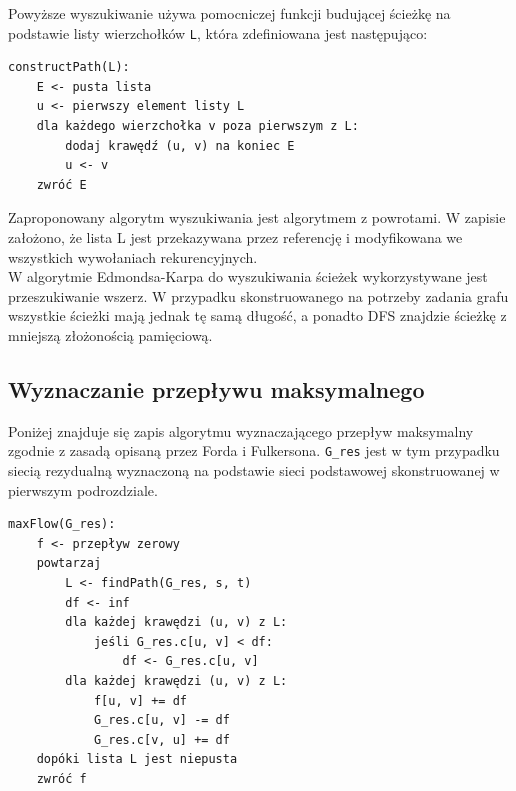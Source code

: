 \documentclass[12pt,a4paper]{article}
\theoremstyle{definition}
\begin{document}
\vspace{0.5em}
\noindent
Powyższe wyszukiwanie używa pomocniczej funkcji budującej ścieżkę na podstawie listy wierzchołków \texttt{L}, która zdefiniowana jest następująco:\\

\begin{tcolorbox}[title=Budowanie ścieżki na podstawie wierzchołków]
\begin{verbatim}
constructPath(L):
    E <- pusta lista
    u <- pierwszy element listy L
    dla każdego wierzchołka v poza pierwszym z L:
        dodaj krawędź (u, v) na koniec E
        u <- v
    zwróć E
\end{verbatim}
\end{tcolorbox}

\vspace{0.5em}
\noindent
Zaproponowany algorytm wyszukiwania jest algorytmem z powrotami. W zapisie założono, że lista L jest przekazywana przez referencję i modyfikowana we wszystkich wywołaniach rekurencyjnych.\\

\noindent
W algorytmie Edmondsa-Karpa do wyszukiwania ścieżek wykorzystywane jest przeszukiwanie wszerz. W przypadku skonstruowanego na potrzeby zadania grafu wszystkie ścieżki mają jednak tę samą długość, a ponadto DFS znajdzie ścieżkę z mniejszą złożonością pamięciową.

\subsection{Wyznaczanie przepływu maksymalnego}
Poniżej znajduje się zapis algorytmu wyznaczającego przepływ maksymalny zgodnie z zasadą opisaną przez Forda i Fulkersona. \texttt{G\_res} jest w tym przypadku siecią rezydualną wyznaczoną na podstawie sieci podstawowej skonstruowanej w pierwszym podrozdziale.\\

\begin{tcolorbox}[title=Wyznaczanie przepływu maksymalnego]
\begin{verbatim}
maxFlow(G_res):
    f <- przepływ zerowy
    powtarzaj
        L <- findPath(G_res, s, t)
        df <- inf
        dla każdej krawędzi (u, v) z L:
            jeśli G_res.c[u, v] < df:
                df <- G_res.c[u, v]
        dla każdej krawędzi (u, v) z L:
            f[u, v] += df
            G_res.c[u, v] -= df
            G_res.c[v, u] += df
    dopóki lista L jest niepusta
    zwróć f
\end{verbatim}
\end{tcolorbox}
\end{document}
